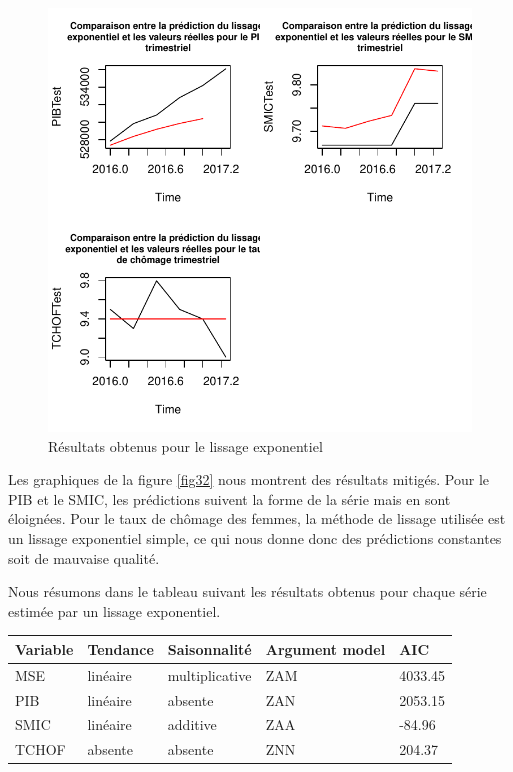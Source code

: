 \documentclass[11pt,]{article}
\begin{document}
\begin{figure}

{\centering \includegraphics{Rapport_final_files/figure-latex/unnamed-chunk-53-1} 

}

\caption{\label{fig32} Résultats obtenus pour le lissage exponentiel}\label{fig:unnamed-chunk-53}
\end{figure}

Les graphiques de la figure \ref{fig32} nous montrent des résultats
mitigés. Pour le PIB et le SMIC, les prédictions suivent la forme de la
série mais en sont éloignées. Pour le taux de chômage des femmes, la
méthode de lissage utilisée est un lissage exponentiel simple, ce qui
nous donne donc des prédictions constantes soit de mauvaise qualité.

Nous résumons dans le tableau suivant les résultats obtenus pour chaque
série estimée par un lissage exponentiel.

\begin{longtable}[]{@{}lllll@{}}
\toprule
Variable & Tendance & Saisonnalité & Argument model & AIC\tabularnewline
\midrule
\endhead
MSE & linéaire & multiplicative & ZAM & 4033.45\tabularnewline
PIB & linéaire & absente & ZAN & 2053.15\tabularnewline
SMIC & linéaire & additive & ZAA & -84.96\tabularnewline
TCHOF & absente & absente & ZNN & 204.37\tabularnewline
\bottomrule
\end{longtable}
\end{document}
